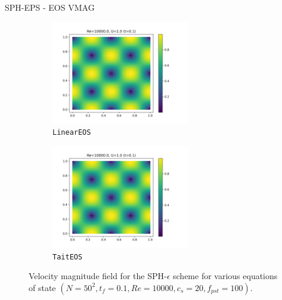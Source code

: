 SPH-EPS - EOS VMAG 
\begin{figure}[H]
  \begin{subfigure}{7cm}
  \centering\includegraphics[width=6cm]{Code-Figures/mon2017/eos/c0_20_linear_pec_dtmul_1_nx_50_pst_10_re_10000_mon2017/final_vmag.png}
  \caption{\texttt{LinearEOS}}
  \end{subfigure}
  \begin{subfigure}{7cm}
  \centering\includegraphics[width=6cm]{Code-Figures/mon2017/eos/c0_20_tait_pec_dtmul_1_nx_50_pst_10_re_10000_mon2017/final_vmag.png}
  \caption{\texttt{TaitEOS}}
  \end{subfigure}
  \caption{Velocity magnitude field for the SPH-$\epsilon$ scheme for various equations of state $(N=50^2, t_f=0.1, Re=10000, c_s=20, f_{pst}=100)$.}
  \label{fig:sph-eps-eos-vmag}
\end{figure}

